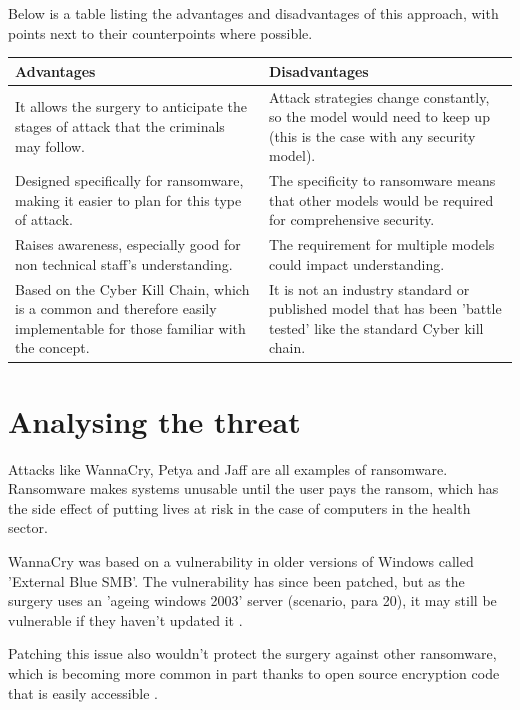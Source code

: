 \documentclass[12pt,a4paper]{article}
\begin{document}
\newpage
Below is a table listing the advantages and disadvantages of this approach, with points next to their counterpoints where possible.

\begin{center}
\begin{longtable}{ |p{}|p{}| } 
 \hline
 \textbf{Advantages} & \textbf{Disadvantages} \\ 
  \hline
 It allows the surgery to anticipate the stages of attack that the criminals may follow. & Attack strategies change constantly, so the model would need to keep up (this is the case with any security model). \\ 
  \hline
 Designed specifically for ransomware, making it easier to plan for this type of attack. & The specificity to ransomware means that other models would be required for comprehensive security. \\ 
 \hline
 Raises awareness, especially good for non technical staff's understanding. & The requirement for multiple models could impact understanding. \\ 
 \hline
 Based on the Cyber Kill Chain, which is a common and therefore easily implementable for those familiar with the concept. & It is not an industry standard or published model that has been 'battle tested' like the standard Cyber kill chain. \\ 
 \hline
\end{longtable}
\caption{\textit{Table 2: Advantages and disadvantages of the Ransomware Kill Chain}}
\end{center}

\section{Analysing the threat}
Attacks like WannaCry, Petya and Jaff are all examples of ransomware. Ransomware makes systems unusable until the user pays the ransom, which has the side effect of putting lives at risk in the case of computers in the health sector.

WannaCry was based on a vulnerability in older versions of Windows called 'External Blue SMB'. The vulnerability has since been patched, but as the surgery uses an 'ageing windows 2003' server (scenario, para 20), it may still be vulnerable if they haven't updated it \cite{wannaUpdate}.

Patching this issue also wouldn't protect the surgery against other ransomware, which is becoming more common in part thanks to open source encryption code that is easily accessible \cite{openRansom}.
\end{document}

